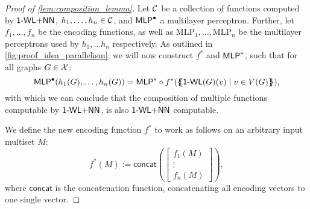 \begin{proof}[Proof of \cref{lem:composition_lemma}]
    Let $\mathcal{C}$ be a collection of functions computed by $\textsf{1-WL+NN}$, $h_1, \dots ,h_n \in \mathcal{C}$, and $\textsf{MLP}^\bullet$ a multilayer perceptron. Further, let $f_{1}, \ldots, f_{n}$ be the encoding functions, as well as $\text{MLP}_1, \ldots, \text{MLP}_n$ be the multilayer perceptrons used by $h_1, \dots h_n$ respectively. As outlined in \cref{fig:proof_idea_parallelism}, we will now construct $f^*$ and $\textsf{MLP}^*$, such that for all graphs $G \in \mathcal{X}$:
    \begin{equation*}
        \textsf{MLP}^\bullet(h_1(G), \dots ,h_n(G)) = \textsf{MLP}^* \circ f^* (\{\!\!\{ \textsf{1-WL}(G)(v) \mid v \in V(G) \}\!\!\}),
    \end{equation*}
    with which we can conclude that the composition of multiple functions computable by $\textsf{1-WL+NN}$, is also $\textsf{1-WL+NN}$ computable. 

    We define the new encoding function $f^*$ to work as follows on an arbitrary input multiset $M$:
    \begin{equation*}
        f^*(M) := \textsf{concat}(
            \begin{bmatrix}
                f_1(M)\\
                \vdots\\
                f_n(M)
            \end{bmatrix}),
    \end{equation*}
    where $\textsf{concat}$ is the concatenation function, concatenating all encoding vectors to one single vector.


\end{proof}
